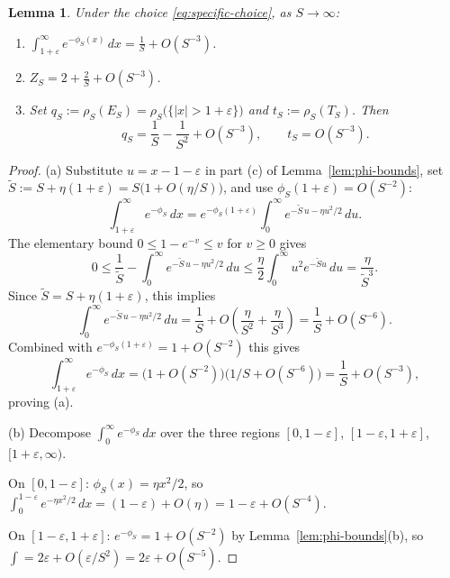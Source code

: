 \documentclass{article}
\newtheorem{lemma}[theorem]{Lemma}
\theoremstyle{remark}
\begin{document}
\begin{lemma}\label{lem:normalization}
Under the choice \eqref{eq:specific-choice}, as $S\to\infty$:
\begin{enumerate}
\item[(a)] $\displaystyle\int_{1+\varepsilon}^{\infty}e^{-\phi_S(x)}\,dx
  =\frac{1}{S}+O(S^{-3})$.
\item[(b)] $\displaystyle Z_S = 2+\frac{2}{S}+O(S^{-3})$.
\item[(c)] Set
  $q_S:=\rho_S(E_S)=\rho_S\bigl(\{|x|>1+\varepsilon\}\bigr)$
  and $t_S:=\rho_S(T_S)$. Then
  \[
    q_S = \frac{1}{S}-\frac{1}{S^2}+O(S^{-3}),\qquad t_S=O(S^{-3}).
  \]
\end{enumerate}
\end{lemma}

\begin{proof}
(a) Substitute $u=x-1-\varepsilon$ in part (c) of
Lemma~\ref{lem:phi-bounds}, set $\widetilde S:=S+\eta(1+\varepsilon)=
S\bigl(1+O(\eta/S)\bigr)$, and use $\phi_S(1+\varepsilon)=O(S^{-2})$:
\[
  \int_{1+\varepsilon}^{\infty}e^{-\phi_S}\,dx
  = e^{-\phi_S(1+\varepsilon)}\int_0^{\infty}
     e^{-\widetilde S\,u-\eta u^2/2}\,du.
\]
The elementary bound $0\le 1-e^{-v}\le v$ for $v\ge0$ gives
\begin{equation}\label{eq:tail-expansion}
  0\le
  \frac{1}{\widetilde S}
  -\int_0^{\infty}e^{-\widetilde S\,u-\eta u^2/2}\,du
  \le
  \frac{\eta}{2}\int_0^\infty u^2e^{-\widetilde S u}\,du
  =\frac{\eta}{\widetilde S^3}.
\end{equation}
Since $\widetilde S=S+\eta(1+\varepsilon)$, this implies
\[
  \int_0^{\infty}e^{-\widetilde S\,u-\eta u^2/2}\,du
  =\frac{1}{S}+O\!\left(\frac{\eta}{S^2}+\frac{\eta}{S^3}\right)
  =\frac{1}{S}+O(S^{-6}).
\]
Combined with $e^{-\phi_S(1+\varepsilon)}=1+O(S^{-2})$ this gives
\[
  \int_{1+\varepsilon}^{\infty}e^{-\phi_S}\,dx
  =\bigl(1+O(S^{-2})\bigr)\bigl(1/S+O(S^{-6})\bigr)
  =\frac{1}{S}+O(S^{-3}),
\]
proving (a).

(b) Decompose $\int_0^{\infty}e^{-\phi_S}\,dx$ over the three regions
$[0,1-\varepsilon]$, $[1-\varepsilon,1+\varepsilon]$, $[1+\varepsilon,\infty)$.

On $[0,1-\varepsilon]$: $\phi_S(x)=\eta x^2/2$, so
$\int_0^{1-\varepsilon}e^{-\eta x^2/2}\,dx=(1-\varepsilon)+O(\eta)
=1-\varepsilon+O(S^{-4})$.

On $[1-\varepsilon,1+\varepsilon]$: $e^{-\phi_S}=1+O(S^{-2})$ by
Lemma~\ref{lem:phi-bounds}(b), so
$\int=2\varepsilon+O(\varepsilon/S^2)=2\varepsilon+O(S^{-5})$.


\end{proof}
\end{document}

